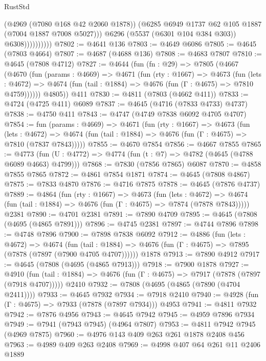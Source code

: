 \begin{lexlean}{RustStd}
\begin{coremodule}
                          (@4969 (@7080 @168 @42 @2060 @1878))
                          (@6285 @6949 @1737 @62 @105 @1887 (@7004 @1887 @7008 @5027)))
                        @6296
                        (@5537 (@6301 @104 @384 @303))
                        @6308))))))))))
@7802 := @4641 @136
@7803 := @4649 @6086
@7805 := @4645 (@7803 @4664)
@7807 := @4687 (@4688 @136)
@7808 := @4683 @7807
@7810 := @4645 (@7808 @4712)
@7827 := @4644
    (fun (fn : @29) =>
    @7805
      (@4667
        (@4670
          (fun (params : @4669) =>
          @4671
            (fun (rty : @1667) =>
            @4673
              (fun (lets : @4672) =>
              @4674 (fun (tail : @1884) => @4676 (fun (Γ : @4675) => @7810 @4759))))))
        @4805))
    @411
@7830 := @4811 (@7803 (@4662 @411))
@7833 := @4724 (@4725 @411) @6089
@7837 := @4645 (@4716 (@7833 @4733) @4737)
@7838 := @4750 @411
@7843 := @4747 (@4749 @7838 @6092 @4705 @4707)
@7854 := fun (params : @4669) =>
  @4671
    (fun (rty : @1667) =>
    @4673
      (fun (lets : @4672) =>
      @4674 (fun (tail : @1884) => @4676 (fun (Γ : @4675) => @7810 (@7837 @7843)))))
@7855 := @4670 @7854
@7856 := @4667 @7855
@7865 := @4773 (fun (U : @4772) => @4774 (fun (t : @7) => @4782 (@4645 (@4788 @6089 @4663) @4799)))
@7868 := @7830 (@7856 @7865) @6087
@7870 := @4858 @7855 @7865
@7872 := @4861 @7854 @1871
@7874 := @4645 (@7808 @4867)
@7875 := @7833 @4870
@7876 := @4716 @7875
@7878 := @4645 (@7876 @4737)
@7889 := @4864
    (fun (rty : @1667) =>
    @4673
      (fun (lets : @4672) =>
      @4674 (fun (tail : @1884) => @4676 (fun (Γ : @4675) => @7874 (@7878 @7843)))))
    @2381
@7890 := @4701 @2381
@7891 := @7890 @4709
@7895 := @4645 (@7808 (@4695 (@4865 @7891)))
@7896 := @4745 @2381
@7897 := @4744 @7896
@7898 := @4748 @7896
@7900 := @7898 @7838 @6092
@7912 := @4886
    (fun (lets : @4672) =>
    @4674
      (fun (tail : @1884) => @4676 (fun (Γ : @4675) => @7895 (@7878 (@7897 (@7900 @4705 @4707))))))
    @1878
@7913 := @7890 @4912
@7917 := @4645 (@7808 (@4695 (@4865 @7913)))
@7918 := @7900 @1878
@7927 := @4910
    (fun (tail : @1884) => @4676 (fun (Γ : @4675) => @7917 (@7878 (@7897 (@7918 @4707)))))
    @2410
@7932 := @7808 (@4695 (@4865 (@7890 (@4704 @2411))))
@7933 := @4645 @7932
@7934 := @7918 @2410
@7940 := @4928 (fun (Γ : @4675) => @7933 (@7878 (@7897 @7934))) @4953
@7941 := @4811 @7932
@7942 := @7876 @4956
@7943 := @4645 @7942
@7945 := @4959 @7896 @7934
@7949 := @7941 (@7943 @7945) (@4964 @7807)
@7953 := @4811 @7942 @7945 (@4969 @7875)
@7960 := @4976 @143 @409 @263 @261 @1878 @2408 @456
@7963 := @4989 @409 @263 @2408
@7969 := @4998 @407 @64 @261 @11 @2406 @1889

\end{coremodule}
\end{lexlean}
